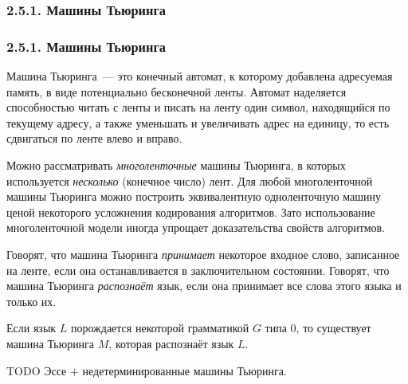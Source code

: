 \documentclass[mathserif,12pt,aspectratio=169]{beamer}
\def\emразделенной{\em разделенной}
\renewcommand{\index}[1]{}
\def\em#1{\it\color{blue}#1}
\def\odmkey#1#2{{\it\color{red} #1}\index{#2}}
\def\TODO#1{{\color{gray} TODO {#1}}}
\begin{document}
\subsubsection{2.5.1. Машины Тьюринга}\label{2.5.1.}
\begin{frame}
\frametitle{2.5.1. Машины Тьюринга}

Машина Тьюринга~--- это конечный автомат,
к которому добавлена адресуемая память,
в виде потенциально бесконечной ленты.
Автомат наделяется способностью 
читать с ленты  и писать на ленту один символ,
находящийся по текущему адресу, а также
уменьшать и увеличивать адрес на единицу, то есть сдвигаться по ленте влево и вправо. 
\begin{remark}
Можно рассматривать 
\odmkey{многоленточные}{Машина!Тьюринга!многоленточная}
машины Тьюринга,
в которых используется 
{\em несколько} (конечное число) лент.
Для любой многоленточной машины Тьюринга
можно построить эквивалентную одноленточную машину
ценой некоторого усложнения кодирования алгоритмов.
Зато использование многоленточной модели
иногда упрощает доказательства свойств алгоритмов. 
\end{remark}

\medskip
Говорят, что машина Тьюринга 
{\em принимает} некоторое входное слово, записанное на ленте,
если она останавливается в заключительном состоянии. 
Говорят, что машина Тьюринга {\em распознаёт} язык,
если она принимает все слова этого языка и только их.

\medskip
\begin{theorem}
Если язык $L$ порождается некоторой 
грамматикой $G$ типа 0, то существует машина 
Тьюринга $M$, которая распознаёт язык $L$.
\end{theorem}
\TODO{Эссе + недетерминированные машины Тьюринга.} 
\end{frame}
\end{document}
